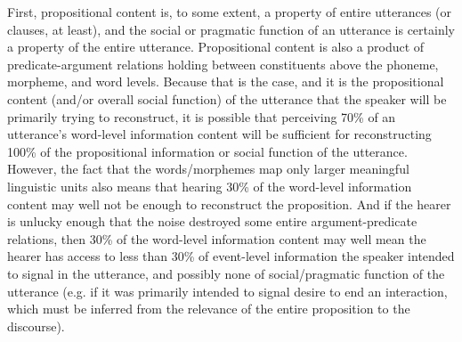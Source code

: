 \documentclass[12pt]{article}
\begin{document}
First, propositional content is, to some extent, a property of entire utterances (or clauses, at least), and the social or pragmatic function of an utterance is certainly a property of the entire utterance. Propositional content is also a product of predicate-argument relations holding between constituents above the phoneme, morpheme, and word levels. Because that is the case, and it is the propositional content (and/or overall social function) of the utterance that the speaker will be primarily trying to reconstruct, it is possible that perceiving 70\% of an utterance's word-level information content will be sufficient for reconstructing 100\% of the propositional information or social function of the utterance. However, the fact that the words/morphemes map only larger meaningful linguistic units also means that hearing 30\% of the word-level information content may well not be enough to reconstruct the proposition. And if the hearer is unlucky enough that the noise destroyed some entire argument-predicate relations, then 30\% of the word-level information content may well mean the hearer has access to less than 30\% of event-level information the speaker intended to signal in the utterance, and possibly none of social/pragmatic function of the utterance (e.g. if it was primarily intended to signal desire to end an interaction, which must be inferred from the relevance of the entire proposition to the discourse). 


 
\end{document}

